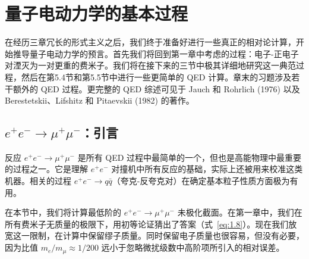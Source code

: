 \chapter{量子电动力学的基本过程}

在经历三章冗长的形式主义之后，我们终于准备好进行一些真正的相对论计算，开始推导量子电动力学的预言。首先我们将回到第一章中考虑的过程：电子-正电子对湮灭为一对更重的费米子。我们将在接下来的三节中极其详细地研究这一典范过程，然后在第5.4节和第5.5节中进行一些更简单的 QED 计算。章末的习题涉及若干额外的 QED 过程。更完整的 QED 综述可见于 Jauch 和 Rohrlich (1976) 以及 Berestetskii、Lifshitz 和 Pitaevskii (1982) 的著作。

\section{$e^{+}e^{-}\to\mu^{+}\mu^{-}$：引言}

反应 $e^{+}e^{-}\to\mu^{+}\mu^{-}$ 是所有 QED 过程中最简单的一个，但也是高能物理中最重要的过程之一。它是理解 $e^{+}e^{-}$ 对撞机中所有反应的基础，实际上还被用来校准这类机器。相关的过程 $e^{+}e^{-}\to q\bar{q}$（夸克-反夸克对）在确定基本粒子性质方面极为有用。

在本节中，我们将计算最低阶的 $e^{+}e^{-}\to\mu^{+}\mu^{-}$ 未极化截面。在第一章中，我们在所有费米子无质量的极限下，用初等论证猜出了答案（式~\eqref{eq:1.8}）。现在我们放宽这一限制，在计算中保留缪子质量。同时保留电子质量也很容易，但没有必要，因为比值 $m_e/m_\mu \approx 1/200$ 远小于忽略微扰级数中高阶项所引入的相对误差。

